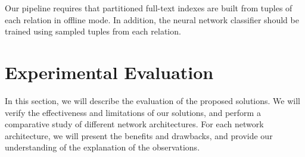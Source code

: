 \documentclass[conference]{IEEEtran}
\begin{document}
Our pipeline requires that partitioned full-text indexes are built from tuples of each relation in offline mode. In addition, the neural network classifier should be trained using sampled tuples from each relation.
















\section{Experimental Evaluation}

In this section, we will describe the evaluation of the proposed solutions.  We will verify the effectiveness and limitations of our solutions, and perform a comparative study of different network architectures.  For each network architecture, we will present the benefits and drawbacks, and provide our understanding of the explanation of the observations.
\end{document}
